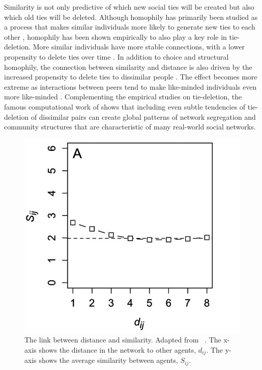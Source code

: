 \documentclass[11pt]{article}
\begin{document}
\noindent Similarity is not only predictive of which new social ties will be created but also which old ties will be deleted. Although homophily has primarily been studied as a process that makes similar individuals more likely to generate new ties to each other \cite{noel2011unfriending, bener_empirical_2016}, homophily has been shown empirically to also play a key role in tie-deletion. More similar individuals have more stable connections, with a lower propensity to delete ties over time \cite{noel2011unfriending, bener_empirical_2016, mcpherson_birds_2001, kossinets_origins_2009}.
In addition to choice and structural homophily, the connection between similarity and distance is also driven by the increased propensity to delete ties to dissimilar people \cite{kossinets_origins_2009, bener_empirical_2016}. The effect becomes more extreme as interactions between peers tend to make like-minded individuals even more like-minded \cite{friedkin_social_1990, spears_social_2021}. Complementing the empirical studies on tie-deletion, the famous computational work of  shows that including even subtle tendencies of tie-deletion of dissimilar pairs can create global patterns of network segregation and community structures that are characteristic of many real-world social networks. 

\begin{figure}[H]
   \centering
   \includegraphics[width=.5\linewidth]{../plots/references/kossinets_watts_distance.jpeg}
 \caption{The link between distance and similarity. Adapted from \ \protect{}. The x-axis shows the distance in the network to other agents, $d_{ij}$. The y-axis shows the average similarity between agents, $S_{ij}$.}
 \label{fig:distance_similarity}
\end{figure}
\end{document}
